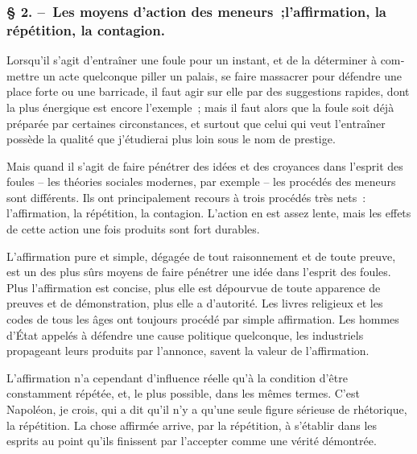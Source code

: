 \documentclass[french,twoside]{book} %
\begin{document}
\subsubsection[{§ 2. – Les moyens d’action des meneurs ;l’affirmation, la répétition, la contagion.}]{§ 2. – Les moyens d’action des meneurs ;l’affirmation, la répétition, la contagion.}
\noindent Lorsqu’il s’agit d’entraîner une foule pour un instant, et de la déterminer à com­mettre un acte quelconque piller un palais, se faire massacrer pour défendre une place forte ou une barricade, il faut agir sur elle par des suggestions rapides, dont la plus énergique est encore l’exemple ; mais il faut alors que la foule soit déjà préparée par certaines circonstances, et surtout que celui qui veut l’entraîner possède la qualité que j’étudierai plus loin sous le nom de prestige.\par
Mais quand il s’agit de faire pénétrer des idées et des croyances dans l’esprit des foules – les théories sociales modernes, par exemple – les procédés des meneurs sont différents. Ils ont principalement recours à trois procédés très nets : l’affirmation, la répétition, la contagion. L’action en est assez lente, mais les effets de cette action une fois produits sont fort durables.\par
L’affirmation pure et simple, dégagée de tout raisonnement et de toute preuve, est un des plus sûrs moyens de faire pénétrer une idée dans l’esprit des foules. Plus l’affirmation est concise, plus elle est dépourvue de toute apparence de preuves et de démonstration, plus elle a d’autorité. Les livres religieux et les codes de tous les âges ont toujours procédé par simple affirmation. Les hommes d’État appelés à défendre une cause politique quelconque, les industriels propageant leurs produits par l’annon­ce, savent la valeur de l’affirmation.\par
L’affirmation n’a cependant d’influence réelle qu’à la condition d’être constamment répétée, et, le plus possible, dans les mêmes termes. C’est Napoléon, je crois, qui a dit qu’il n’y a qu’une seule figure sérieuse de rhétorique, la répétition. La chose affirmée arrive, par la répétition, à s’établir dans les esprits au point qu’ils finissent par l’accep­ter comme une vérité démontrée.\par
\end{document}
